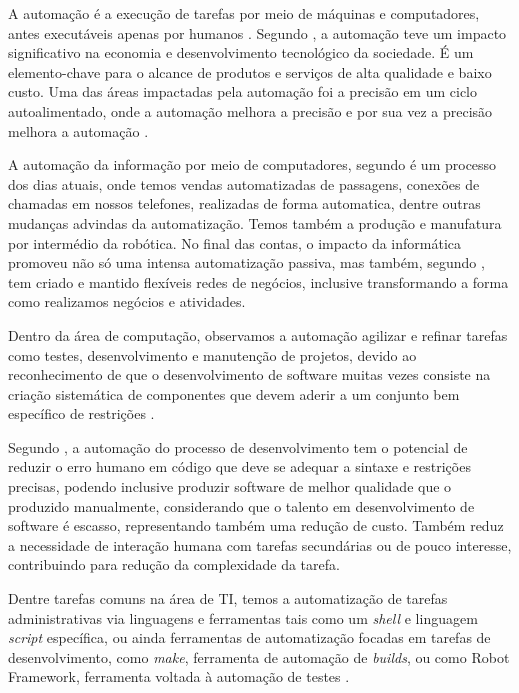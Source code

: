 \documentclass[tg]{mdtufsm}
\begin{document}
            A automação é a execução de tarefas por meio de máquinas e computadores, antes executáveis apenas por humanos \cite{automationlevels}. Segundo \citeauthor{automation2009} \cite[pág. 124]{automation2009}, a automação teve um impacto significativo na economia e desenvolvimento tecnológico da sociedade. É um elemento-chave para o alcance de produtos e serviços de alta qualidade e baixo custo. Uma das áreas impactadas pela automação foi a precisão em um ciclo autoalimentado, onde a automação melhora a precisão e por sua vez a precisão melhora a automação \cite{auto2008precision}.

        	A automação da informação por meio de computadores, segundo \citeauthor{automation2009} \cite[pág. 3]{automation2009} é um processo dos dias atuais, onde temos vendas automatizadas de passagens, conexões de chamadas em nossos telefones, realizadas de forma automatica, dentre outras mudanças advindas da automatização. Temos também a produção e manufatura por intermédio da robótica. No final das contas, o impacto da informática promoveu não só uma intensa automatização passiva, mas também, segundo \citeauthor{itEnabledBusiness}\cite{itEnabledBusiness}, tem criado e mantido flexíveis redes de negócios, inclusive transformando a forma como realizamos negócios e atividades.

        	Dentro da área de computação, observamos a automação agilizar e refinar tarefas como testes, desenvolvimento e manutenção de projetos, devido ao reconhecimento de que o desenvolvimento de software muitas vezes consiste na criação sistemática de componentes que devem aderir a um conjunto bem específico de restrições \cite{automionSoftEvolutionEffect}.

        	Segundo \citeauthor{automionSoftEvolutionEffect}\cite{automionSoftEvolutionEffect}, a automação do processo de desenvolvimento tem o potencial de reduzir o erro humano em código que deve se adequar a sintaxe e restrições precisas, podendo inclusive produzir software de melhor qualidade que o produzido manualmente, considerando que o talento em desenvolvimento de software é escasso, representando também uma redução de custo.
        	Também reduz a necessidade de interação humana com tarefas secundárias ou de pouco interesse, contribuindo para redução da complexidade da tarefa.

        	Dentre tarefas comuns na área de TI, temos a automatização de tarefas administrativas via linguagens e ferramentas tais como um \emph{shell} e linguagem \emph{script} específica, ou ainda ferramentas de automatização focadas em tarefas de desenvolvimento, como \emph{make}, ferramenta de automação de \emph{builds}, ou como Robot Framework, ferramenta voltada à automação de testes \cite{shell,make,robotFW}.
\end{document}
